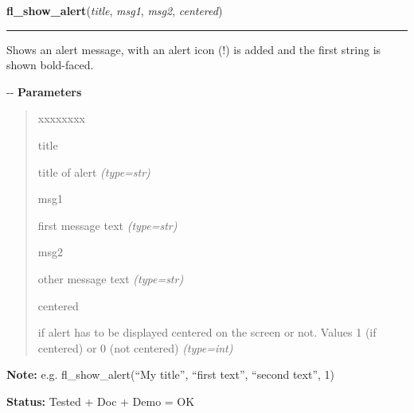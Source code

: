 \hspace{.8\funcindent}\begin{boxedminipage}{\funcwidth}

    \raggedright \textbf{fl\_show\_alert}(\textit{title}, \textit{msg1}, \textit{msg2}, \textit{centered})

    \vspace{-1.5ex}

    \rule{\textwidth}{0.5\fboxrule}
\setlength{\parskip}{2ex}

Shows an alert message, with an alert icon (!) is added and the
first string is shown bold-faced.

-{}-
\setlength{\parskip}{1ex}
      \textbf{Parameters}
      \vspace{-1ex}

      \begin{quote}
        \begin{Ventry}{xxxxxxxx}

          \item[title]


title of alert
            {\it (type=str)}

          \item[msg1]


first message text
            {\it (type=str)}

          \item[msg2]


other message text
            {\it (type=str)}

          \item[centered]


if alert has to be displayed centered on the screen or not. Values 1
(if centered) or 0 (not centered)
            {\it (type=int)}

        \end{Ventry}

      \end{quote}

\textbf{Note:} 
e.g. fl\_show\_alert(``My title'', ``first text'', ``second text'', 1)


\textbf{Status:} 
Tested + Doc + Demo = OK


    \end{boxedminipage}

    \label{xformslib:flgoodies:fl_show_alert2}

